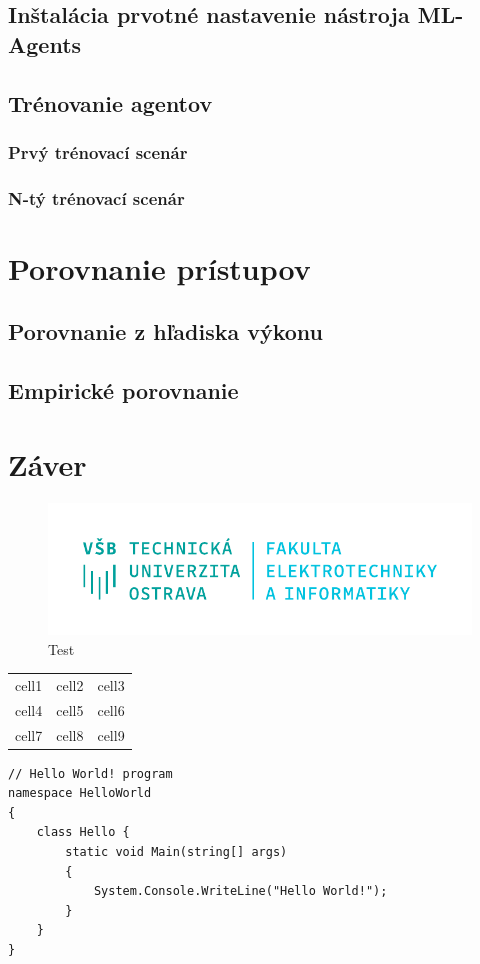 \documentclass[slovak, master]{diploma}
\begin{document}
\section{Inštalácia prvotné nastavenie nástroja ML-Agents}
\label{sec:Agents}
\section{Trénovanie agentov}
\label{sec:Training}
\subsection{Prvý trénovací scenár}
\label{sec:FirstScenario}
\subsection{N-tý trénovací scenár}
\label{sec:LastScenario}

\chapter{Porovnanie prístupov}
\label{sec:ImplReinforcement learning}
\section{Porovnanie z hľadiska výkonu}
\label{sec:Performance}
\section{Empirické porovnanie}
\label{sec:Gameplay}

\chapter{Záver}
\label{sec:Conclusion}

\begin{figure}[!htbp]
	\centering
	\includegraphics[width=.5\textwidth]{Figures/FEI_CZ.pdf}
	\caption{Test}
	\label{pic:Teeest}
\end{figure}

\begin{center}
\begin{tabular}{ c c c }
 cell1 & cell2 & cell3 \\ 
 cell4 & cell5 & cell6 \\  
 cell7 & cell8 & cell9    
\end{tabular}
\end{center}

\begin{lstlisting}[label=src:Test,caption={Test}]
// Hello World! program
namespace HelloWorld
{
    class Hello {         
        static void Main(string[] args)
        {
            System.Console.WriteLine("Hello World!");
        }
    }
}
\end{lstlisting}

\end{document}
